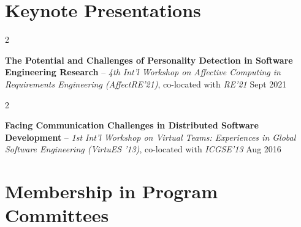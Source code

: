 \documentclass[10pt, a4paper]{article}
\newenvironment{twocolentry}[2][]{
    \onecolentry
    \def\secondColumn{#2}
    \setcolumnwidth{\fill, 4.5 cm}
    \begin{paracol}{2}
}{
    \switchcolumn \raggedleft \secondColumn
    \end{paracol}
    \endonecolentry
} %
\begin{document}
    
    \section{Keynote Presentations}



        
        \begin{twocolentry}{
            Sept 2021
        }
            \textbf{The Potential and Challenges of Personality Detection in Software Engineering Research} -- \textit{4th Int'l Workshop on Affective Computing in Requirements Engineering (AffectRE’21)}, co-located with \textit{RE’21}\end{twocolentry}



        \vspace{0.2 cm}

        \begin{twocolentry}{
            Aug 2016
        }
            \textbf{Facing Communication Challenges in Distributed Software Development} -- \textit{1st Int’l Workshop on Virtual Teams: Experiences in Global Software Engineering (VirtuES ’13)}, co-located with \textit{ICGSE’13}\end{twocolentry}




    
    \section{Membership in Program Committees}
\end{document}
